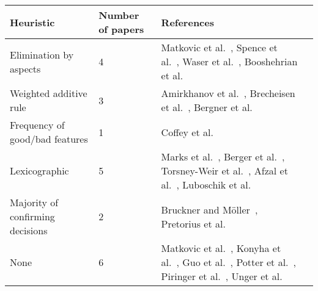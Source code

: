 
\begin{supertabular}[c]{@{}llll@{}}
\toprule
Heuristic & Number of papers & References\tabularnewline
\midrule
Elimination by aspects & 4 & Matkovic et al.~\citep{Matkovic:2009},
                             Spence et al.~\citep{Spence:1995},
                             Waser et al.~\citep{Waser:2010},
                             Booshehrian et al.~\citep{Booshehrian:2012}\tabularnewline
Weighted additive rule & 3 & Amirkhanov et al.~\citep{Amirkhanov:2010},
                             Brecheisen et al.~\citep{Brecheisen:2009},
                             Bergner et al.~\citep{Bergner:2013}\tabularnewline
Frequency of good/bad features & 1 & Coffey et al.~\citep{Coffey:2013}\tabularnewline
Lexicographic & 5 & Marks et al.~\citep{Marks:1997},
                    Berger et al.~\citep{Berger:2011},
                    Torsney-Weir et al.~\citep{Torsney-Weir:2011},
                    Afzal et al.~\citep{Afzal:2011},
                    Luboschik et al.~\citep{Luboschik:2014}\tabularnewline
Majority of confirming decisions & 2 & Bruckner and M{\"o}ller~\citep{Bruckner:2010},
                                       Pretorius et al.~\citep{Pretorius:2011}\tabularnewline
None & 6 & Matkovic et al.~\citep{Matkovic:2008},
           Konyha et al.~\citep{Konyha:2006},
           Guo et al.~\citep{Guo:2009},
           Potter et al.~\citep{Potter:2009},
           Piringer et al.~\citep{Piringer:2010},
           Unger et al.~\citep{Unger:2012}\tabularnewline
\bottomrule
\end{supertabular}

